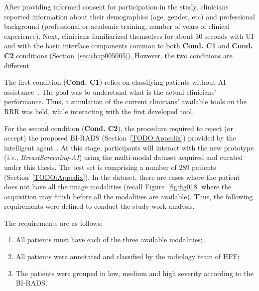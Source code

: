After providing informed consent for participation in the study, clinicians reported information about their demographics (age, gender, etc) and professional background (professional or academic training, number of years of clinical experience).
Next, clinicians familiarized themselves for about 30 seconds with \ac{UI} and with the basic interface components common to both {\bf Cond. C1} and {\bf Cond. C2} conditions (Section~\ref{sec:chap005005}).
However, the two conditions are different.

The first condition ({\bf Cond. C1}) relies on classifying patients without \ac{AI} assistance~\cite{10.1145/3399715.3399744}.
The goal was to understand what is the actual clinicians' performance.
Thus, a simulation of the current clinicians' available tools on the \ac{RRR} was held, while interacting with the first developed tool.

For the second condition ({\bf Cond. C2}), the procedure required to reject (or accept) the proposed \ac{BI-RADS} (Section~\ref{TODO:Appedix}) provided by the intelligent agent~\cite{https://doi.org/10.13140/rg.2.2.16566.14403/1}.
At this stage, participants will interact with the new prototype ({\it i.e.}, {\it BreastScreening-AI}) using the multi-modal dataset acquired and curated under this thesis.
The test set is comprising a number of 289 patients (Section~\ref{TODO:Appedix}).
In the dataset, there are cases where the patient does not have all the image modalities (recall Figure~\ref{fig:fig018} where the acquisition may finish before all the modalities are available).
Thus, the following requirements were defined to conduct the study work analysis.

\vspace{1.5mm}

\noindent
The requirements are as follows:

\vspace{0.5mm}

\begin{enumerate}
\item All patients must have each of the three available modalities;
\item All patients were annotated and classified by the radiology team of \ac{HFF};
\item The patients were grouped in low, medium and high severity according to the \ac{BI-RADS};
\end{enumerate}

